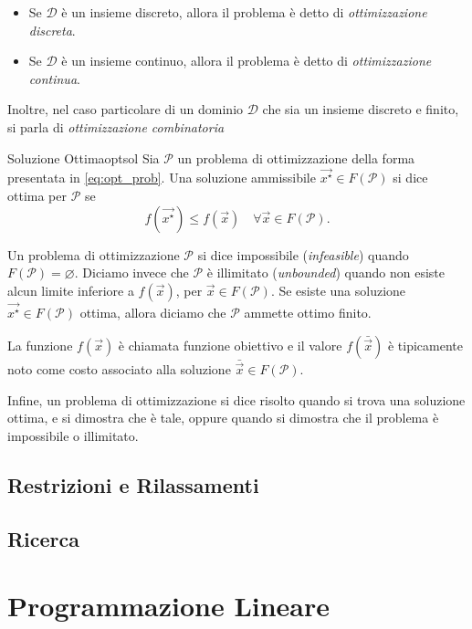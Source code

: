 \begin{itemize}
    \item Se \( \mathcal{D} \) è un insieme discreto, allora il problema è detto di \textit{ottimizzazione discreta}.
    \item Se \( \mathcal{D} \) è un insieme continuo, allora il problema è detto di \textit{ottimizzazione continua}.
\end{itemize}
Inoltre, nel caso particolare di un dominio
\(
    \mathcal{D}
\)
che sia un insieme discreto e finito, si parla di \textit{ottimizzazione combinatoria}
\begin{defbox}{Soluzione Ottima}{optsol}
    Sia \( \mathcal{P} \) un problema di ottimizzazione della forma presentata in \eqref{eq:opt_prob}. Una soluzione
    ammissibile \( \vec{x^{\star}} \in F(\mathcal{P}) \) si dice ottima per \( \mathcal{P} \) se
    \[
        f(\vec{x^{\star}}) \leq f(\vec{x}) \quad \forall \vec{x} \in F(\mathcal{P}).
    \]
\end{defbox}
Un problema di ottimizzazione \( \mathcal{P} \) si dice impossibile (\textit{infeasible}) quando
\(
    F(\mathcal{P}) = \varnothing.
\)
Diciamo invece che
\(
    \mathcal{P}
\)
è illimitato (\textit{unbounded}) quando non esiste alcun limite inferiore a \( f(\vec{x}) \), per \( \vec{x} \in
F(\mathcal{P}) \). Se esiste una soluzione \( \vec{x^{\star}} \in F(\mathcal{P}) \) ottima, allora
diciamo che \( \mathcal{P} \) ammette ottimo finito.

La funzione \( f(\vec{x}) \) è chiamata funzione obiettivo e il valore \( f(\bar{\vec{x}}) \) è tipicamente noto come
costo associato alla soluzione \( \bar{\vec{x}} \in F(\mathcal{P}) \).

Infine, un problema di ottimizzazione si dice risolto quando si trova una soluzione ottima, e si dimostra che è tale,
oppure quando si dimostra che il problema è impossibile o illimitato.

\subsection{Restrizioni e Rilassamenti}

\subsection{Ricerca}

\section{Programmazione Lineare}

